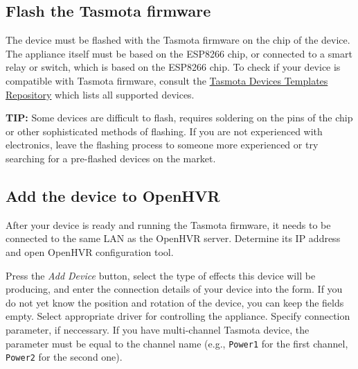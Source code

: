 \subsection{Flash the Tasmota firmware}

The device must be flashed with the Tasmota firmware on the chip of the
device.
The appliance itself must be based on the ESP8266 chip, or connected to a 
smart relay or switch, which is based on the ESP8266 chip. To check if your
device is compatible with Tasmota firmware, consult the 
\hyperlink{https://templates.blakadder.com}{Tasmota Devices Templates Repository}
which lists all supported devices.

\textbf{TIP:} Some devices are difficult to flash, requires soldering on the
pins of the chip or other sophisticated methods of flashing. If you are not
experienced with electronics, leave the flashing process to someone
more experienced or try searching for a pre-flashed devices on the market.

\subsection{Add the device to OpenHVR}

After your device is ready and running the Tasmota firmware, it needs to be
connected to the same LAN as the OpenHVR server. Determine its IP address and
open OpenHVR configuration tool.

Press the \textit{Add Device} button, select the type of effects this device
will be producing, and enter the connection details of your device into
the form. If you do not yet know the position and rotation of the device, you
can keep the fields empty. Select appropriate driver for controlling the
appliance. Specify connection parameter, if neccessary. If you have multi-channel
Tasmota device, the parameter must be equal to the channel name 
(e.g., \verb|Power1| for the first channel, \verb|Power2| for the second one).